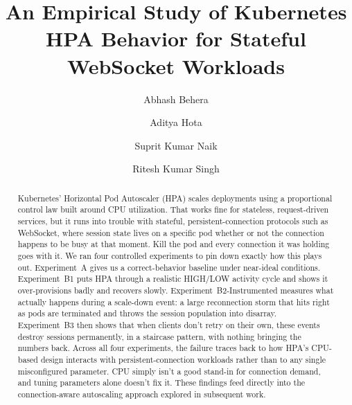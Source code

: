 \documentclass[twocolumn]{svjour3}
\begin{document}
\title{An Empirical Study of Kubernetes HPA Behavior for Stateful WebSocket Workloads}


\author{
Abhash Behera\and
Aditya Hota \and
Suprit Kumar Naik \and
Ritesh Kumar Singh
}

\date{}

\maketitle

\begin{abstract}
Kubernetes' Horizontal Pod Autoscaler (HPA) scales deployments using a
proportional control law built around CPU utilization. That works fine for
stateless, request-driven services, but it runs into trouble with stateful,
persistent-connection protocols such as WebSocket, where session state lives on a
specific pod whether or not the connection happens to be busy at that moment. Kill
the pod and every connection it was holding goes with it. We ran four controlled
experiments to pin down exactly how this plays out. Experiment~A gives us a
correct-behavior baseline under near-ideal conditions. Experiment~B1 puts HPA
through a realistic HIGH/LOW activity cycle and shows it over-provisions badly and
recovers slowly. Experiment~B2-Instrumented measures what actually happens during a
scale-down event: a large reconnection storm that hits right as pods are terminated
and throws the session population into disarray. Experiment~B3 then shows that when
clients don't retry on their own, these events destroy sessions permanently, in a
staircase pattern, with nothing bringing the numbers back. Across all four
experiments, the failure traces back to how HPA's CPU-based design interacts with
persistent-connection workloads rather than to any single misconfigured parameter.
CPU simply isn't a good stand-in for connection demand, and tuning parameters alone
doesn't fix it. These findings feed directly into the connection-aware autoscaling
approach explored in subsequent work.
\end{abstract}
\end{document}
